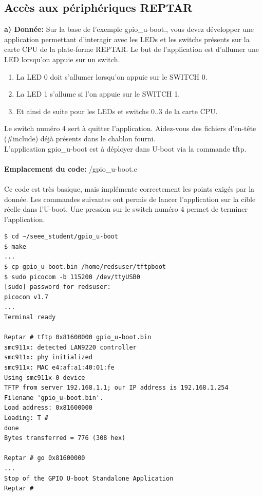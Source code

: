 \subsection{Accès aux périphériques REPTAR}
\textbf{a) Donnée: } Sur la base de l’exemple gpio\_u-boot., vous devez développer une application permettant d’interagir avec les
LEDs et les switchs présents sur la carte CPU de la plate-forme REPTAR.
Le but de l’application est d’allumer une LED lorsqu’on appuie sur un switch.
\begin{enumerate}
	\item La LED 0 doit s’allumer lorsqu’on appuie sur le SWITCH 0.
	\item La LED 1 s’allume si l’on appuie sur le SWITCH 1.
	\item Et ainsi de suite pour les LEDs et switchs 0..3 de la carte CPU.
\end{enumerate}
Le switch numéro 4 sert à quitter l’application. Aidez-vous des fichiers d'en-tête (\#include) déjà présents dans
le chablon fourni.\\
L’application gpio\_u-boot est à déployer dans U-boot via la commande tftp. \\\\
\textbf{Emplacement du code: }/gpio\_u-boot.c\\\\
Ce code est très basique, mais implémente correctement les points exigés par la donnée. Les commandes suivantes ont permis de lancer l'application sur la cible réelle dans l'U-boot. Une pression sur le switch numéro 4 permet de terminer l'application.\\
\begin{lstlisting}
$ cd ~/seee_student/gpio_u-boot
$ make
...
$ cp gpio_u-boot.bin /home/redsuser/tftpboot
$ sudo picocom -b 115200 /dev/ttyUSB0 
[sudo] password for redsuser: 
picocom v1.7
...
Terminal ready

Reptar # tftp 0x81600000 gpio_u-boot.bin
smc911x: detected LAN9220 controller
smc911x: phy initialized
smc911x: MAC e4:af:a1:40:01:fe
Using smc911x-0 device
TFTP from server 192.168.1.1; our IP address is 192.168.1.254
Filename 'gpio_u-boot.bin'.
Load address: 0x81600000
Loading: T #
done
Bytes transferred = 776 (308 hex)

Reptar # go 0x81600000
...
Stop of the GPIO U-boot Standalone Application
Reptar #
\end{lstlisting}